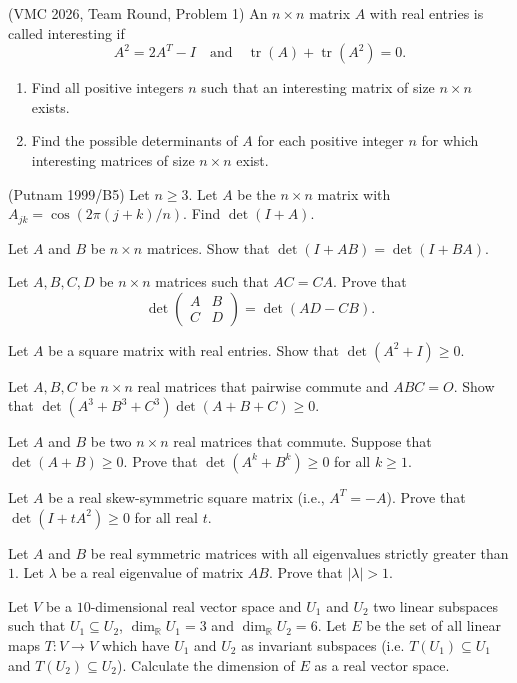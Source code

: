 \documentclass[12pt]{article}
\begin{document}
\begin{problems}
\item (VMC 2026, Team Round, Problem 1) An $n\times n$ matrix $A$ with real entries is called interesting if
\[
A^2 = 2A^T - I \quad\text{and}\quad \operatorname{tr}(A)+\operatorname{tr}(A^2) = 0.
\]
\begin{enumerate}[label=\alph*.]
\item Find all positive integers $n$ such that an interesting matrix of size $n\times n$ exists.
\item Find the possible determinants of $A$ for each positive integer $n$ for which interesting matrices of size $n\times n$ exist.
\end{enumerate}

\item (Putnam 1999/B5) Let $n\ge 3$. Let $A$ be the $n\times n$ matrix with $A_{jk}=\cos(2\pi(j+k)/n)$. Find $\det(I+A)$.

\item Let $A$ and $B$ be $n\times n$ matrices. Show that $\det(I+AB) = \det(I+BA)$.

\item Let $A,B,C,D$ be $n\times n$ matrices such that $AC=CA$. Prove that
\[
\det\begin{pmatrix}A & B\\ C & D\end{pmatrix} = \det(AD-CB).
\]

\item Let $A$ be a square matrix with real entries. Show that $\det(A^2+I)\ge 0$.

\item Let $A,B,C$ be $n\times n$ real matrices that pairwise commute and $ABC=O$. Show that $\det(A^3+B^3+C^3)\det(A+B+C) \ge 0$.

\item Let $A$ and $B$ be two $n\times n$ real matrices that commute. Suppose that $\det(A+B)\ge 0$. Prove that $\det(A^k+B^k) \ge 0$ for all $k\ge 1$.

\item Let $A$ be a real skew-symmetric square matrix (i.e., $A^T=-A$). Prove that $\det(I+tA^2) \ge 0$ for all real $t$.

\item Let $A$ and $B$ be real symmetric matrices with all eigenvalues strictly greater than $1$. Let $\lambda$ be a real eigenvalue of matrix $AB$. Prove that $|\lambda|>1$.

\item Let $V$ be a $10$-dimensional real vector space and $U_1$ and $U_2$ two linear subspaces such that $U_1\subseteq U_2$, $\dim_{\mathbb{R}} U_1=3$ and $\dim_{\mathbb{R}} U_2=6$. Let $E$ be the set of all linear maps $T:V\to V$ which have $U_1$ and $U_2$ as invariant subspaces (i.e. $T(U_1)\subseteq U_1$ and $T(U_2)\subseteq U_2$). Calculate the dimension of $E$ as a real vector space.


\end{problems}
\end{document}
